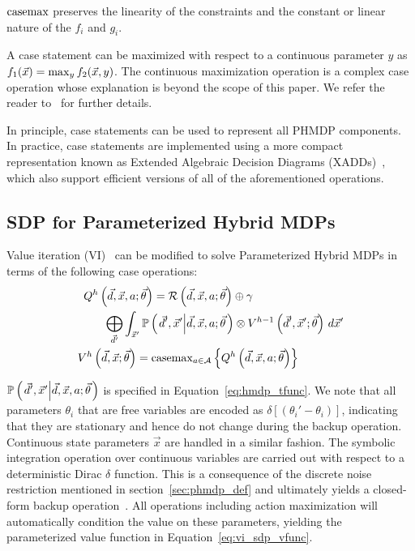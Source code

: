$\mathrm{casemax}$ preserves the linearity of the constraints and the constant or linear nature of the {\footnotesize$f_i$} and {\footnotesize$g_i$}. 

A case statement can be maximized with respect to a continuous parameter {\footnotesize$y$} as {\footnotesize $ f_1(\vec{x}) = \contmax_{y}f_2(\vec{x}, y) $}. The continuous maximization operation is a complex case operation whose explanation is beyond the scope of this paper. We refer the reader to~\cite{Zamani_AAAI_2012} for further details.

In principle, case statements can be used to represent all PHMDP components. In practice, case statements are implemented using a more compact representation known as Extended Algebraic Decision Diagrams (XADDs)~\cite{Sanner_UAI_2011}, which also support efficient versions of all of the aforementioned operations. 

\subsection{SDP for Parameterized Hybrid MDPs}

Value iteration (VI)~\cite{Bellman_PU_1957} can be modified to solve Parameterized Hybrid MDPs in terms of the following case operations:
{\footnotesize 
    \abovedisplayskip=0pt
    \belowdisplayskip=0pt
    \begin{align}
        Q^{h} \left( \vec{d}, \vec{x}, a; \vec{\theta} \right) = \mathcal{R} \left( \vec{d}, \vec{x}, a; \vec{\theta} \right) \oplus \gamma \qquad \qquad \qquad \qquad &  \nonumber \\ 
        \bigoplus_{\vec{d}'} \int_{\vec{x}'} \mathbb{P}\left({ \left. \vec{d}', \vec{x}' \middle| \vec{d}, \vec{x}, a; \vec{\theta} \right.}\right) \otimes V^{h-1} \left( \vec{d}', \vec{x}'; \vec{\theta} \right) \, d\vec{x}' & \label{eq:vi_sdp_qfunc} \\
        V^{h}\left( \vec{d}, \vec{x}; \vec{\theta} \right) = \mathrm{casemax}_{a \in \mathcal{A}} \left\{ Q^{h} \left( \vec{d}, \vec{x}, a; \vec{\theta} \right) \right\} \qquad \qquad & \label{eq:vi_sdp_vfunc}
    \end{align}
}%

{\footnotesize $\mathbb{P}\left({\left. \vec{d}', \vec{x}' \middle| \vec{d}, \vec{x}, a; \vec{\theta} \right.}\right)$ } is specified in Equation~\eqref{eq:hmdp_tfunc}. We note that all parameters {\footnotesize $\theta_i$} that are free variables 
are encoded as {\footnotesize $\delta\left[\left(\theta_i' - \theta_i\right)\right]$}, indicating that they are stationary and hence do not change during the backup operation. Continuous state parameters {\footnotesize $ \vec{x} $} are handled in a similar fashion. The symbolic integration operation over continuous variables are carried out with respect to a deterministic Dirac {\footnotesize $\delta$} function. This is a consequence of the discrete noise restriction mentioned in section~\ref{sec:phmdp_def} and ultimately yields a closed-form backup operation~\cite{Sanner_UAI_2011}. All operations including action maximization will automatically condition the value on these parameters, yielding the parameterized value function in Equation~\eqref{eq:vi_sdp_vfunc}.

